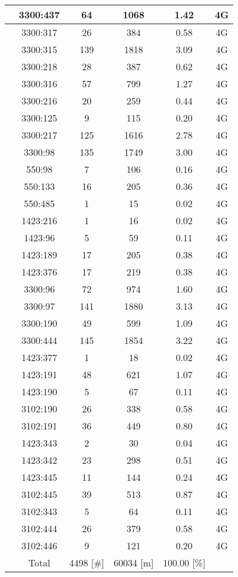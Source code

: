 \begin{longtable*}{|c|c|c|c|c|c|}
 &3300:437&64&1068&1.42&4G\\\hline
{} &3300:317&26&384&0.58&4G\\\hline
{} &3300:315&139&1818&3.09&4G\\\hline
{} &3300:218&28&387&0.62&4G\\\hline
{} &3300:316&57&799&1.27&4G\\\hline
{} &3300:216&20&259&0.44&4G\\\hline
{} &3300:125&9&115&0.20&4G\\\hline
{} &3300:217&125&1616&2.78&4G\\\hline
{} &3300:98&135&1749&3.00&4G\\\hline
{} &550:98&7&106&0.16&4G\\\hline
{} &550:133&16&205&0.36&4G\\\hline
{} &550:485&1&15&0.02&4G\\\hline
{} &1423:216&1&16&0.02&4G\\\hline
{} &1423:96&5&59&0.11&4G\\\hline
{} &1423:189&17&205&0.38&4G\\\hline
{} &1423:376&17&219&0.38&4G\\\hline
{} &3300:96&72&974&1.60&4G\\\hline
{} &3300:97&141&1880&3.13&4G\\\hline
{} &3300:190&49&599&1.09&4G\\\hline
{} &3300:444&145&1854&3.22&4G\\\hline
{} &1423:377&1&18&0.02&4G\\\hline
{} &1423:191&48&621&1.07&4G\\\hline
{} &1423:190&5&67&0.11&4G\\\hline
{} &3102:190&26&338&0.58&4G\\\hline
{} &3102:191&36&449&0.80&4G\\\hline
{} &1423:343&2&30&0.04&4G\\\hline
{} &1423:342&23&298&0.51&4G\\\hline
{} &1423:445&11&144&0.24&4G\\\hline
{} &3102:445&39&513&0.87&4G\\\hline
{} &3102:343&5&64&0.11&4G\\\hline
{} &3102:444&26&379&0.58&4G\\\hline
{} &3102:446&9&121&0.20&4G\\\hline
{} &Total&4498 [\#]&60034 [m]&100.00 [\%]&\\\hline
\end{longtable*}
